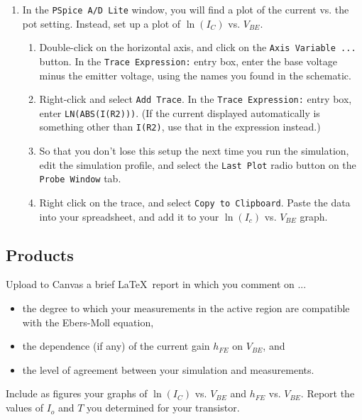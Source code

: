 \documentclass[11pt]{article}
\begin{document}
\begin{enumerate}
\item In the \texttt{PSpice A/D Lite} window, you will find a plot of
  the current vs. the pot setting. Instead, set up a plot of
  $\ln(I_C)$ vs. $V_{BE}$.
  \begin{enumerate}
  \item Double-click on the horizontal axis, and click on the
    \texttt{Axis Variable ...} button. In the \texttt{Trace
      Expression:} entry box, enter the base voltage minus the emitter
    voltage, using the names you found in the schematic.
  \item Right-click and select \texttt{Add Trace}. In the \texttt{Trace
      Expression:} entry box, enter \texttt{LN(ABS(I(R2)))}. (If the
    current displayed automatically is something other than
    \texttt{I(R2)}, use that in the expression instead.)
  \item So that you don't lose this setup the next time you run the
    simulation, edit the simulation profile, and select the
    \texttt{Last Plot} radio button on the \texttt{Probe Window} tab.
  \item Right click on the trace, and select \texttt{Copy to
    Clipboard}. Paste the data into your spreadsheet, and add it to
    your $\ln(I_c)$ vs. $V_{BE}$ graph.
  \end{enumerate}
\end{enumerate}

\subsection*{Products}

Upload to Canvas a brief \LaTeX\ report in which you comment on ...
\begin{itemize}
  \item the degree to which your measurements in the active region are
    compatible with the Ebers-Moll equation,
  \item the dependence (if any) of the current gain $h_{FE}$ on
    $V_{BE}$, and
  \item the level of agreement between your simulation and
    measurements.
\end{itemize}
Include as figures your graphs of $\ln(I_C)$ vs. $V_{BE}$ and $h_{FE}$
vs. $V_{BE}$. Report the values of $I_o$ and $T$ you determined for
your transistor.
\end{document}
